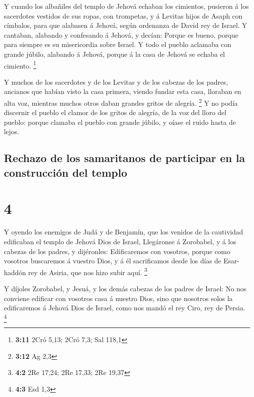  Y cuando los albañiles del templo de Jehová echaban los
cimientos, pusieron á los sacerdotes vestidos de sus ropas, con
trompetas, y á Levitas hijos de Asaph con címbalos, para que alabasen á
Jehová, según ordenanza de David rey de Israel.  Y
cantaban, alabando y confesando á Jehová, y decían: Porque es bueno,
porque para siempre es su misericordia sobre Israel. Y todo el pueblo
aclamaba con grande júbilo, alabando á Jehová, porque á la casa de
Jehová se echaba el cimiento. \footnote{\textbf{3:11} 2Cró 5,13; 2Cró
  7,3; Sal 118,1}

 Y muchos de los sacerdotes y de los Levitas y de los
cabezas de los padres, ancianos que habían visto la casa primera, viendo
fundar esta casa, lloraban en alta voz, mientras muchos otros daban
grandes gritos de alegría. \footnote{\textbf{3:12} Ag 2,3}
 Y no podía discernir el pueblo el clamor de los gritos
de alegría, de la voz del lloro del pueblo: porque clamaba el pueblo con
grande júbilo, y oíase el ruido hasta de lejos.

\hypertarget{rechazo-de-los-samaritanos-de-participar-en-la-construcciuxf3n-del-templo}{%
\subsection{Rechazo de los samaritanos de participar en la construcción
del
templo}\label{rechazo-de-los-samaritanos-de-participar-en-la-construcciuxf3n-del-templo}}

\hypertarget{section-3}{%
\section{4}\label{section-3}}

 Y oyendo los enemigos de Judá y de Benjamín, que los
venidos de la cautividad edificaban el templo de Jehová Dios de Israel,
 Llegáronse á Zorobabel, y á los cabezas de los padres, y
dijéronles: Edificaremos con vosotros, porque como vosotros buscaremos á
vuestro Dios, y á él sacrificamos desde los días de Esar-haddón rey de
Asiria, que nos hizo subir aquí. \footnote{\textbf{4:2} 2Re 17,24; 2Re
  17,33; 2Re 19,37}

 Y díjoles Zorobabel, y Jesuá, y los demás cabezas de los
padres de Israel: No nos conviene edificar con vosotros casa á nuestro
Dios, sino que nosotros solos la edificaremos á Jehová Dios de Israel,
como nos mandó el rey Ciro, rey de Persia. \footnote{\textbf{4:3} Esd
  1,3}


